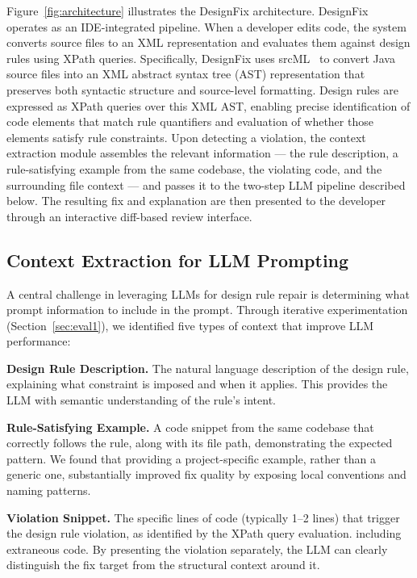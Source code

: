 \documentclass[conference]{IEEEtran}
\begin{document}
Figure~\ref{fig:architecture} illustrates the DesignFix architecture. DesignFix operates as an IDE-integrated pipeline. When a developer edits code, the system converts source files to an XML representation and evaluates them against design rules using XPath queries. Specifically, DesignFix uses srcML~\cite{collard2013srcml} to convert 
Java source files into an XML abstract syntax tree (AST) representation 
that preserves both syntactic structure and source-level formatting. 
Design rules are expressed as XPath queries over this XML AST, enabling 
precise identification of code elements that match rule quantifiers and 
evaluation of whether those elements satisfy rule constraints. Upon detecting a violation, the context extraction module assembles the relevant information — the rule description, a rule-satisfying example from the same codebase, the violating code, and the surrounding file context — and passes it to the two-step LLM pipeline described below. The resulting fix and explanation are then presented to the developer through an interactive diff-based review interface.

\subsection{Context Extraction for LLM Prompting}

A central challenge in leveraging LLMs for design rule repair is 
determining what prompt information to include in the prompt. Through iterative 
experimentation (Section~\ref{sec:eval1}), we identified 
five types of context that improve LLM performance:

\textbf{Design Rule Description.} The natural language description of 
the design rule, explaining what constraint is imposed and when it 
applies. This provides the LLM with semantic understanding of the 
rule's intent.

\textbf{Rule-Satisfying Example.} A code snippet from the same codebase 
that correctly follows the rule, along with its file path, demonstrating 
the expected pattern. We found that providing a project-specific example, 
rather than a generic one, substantially improved fix quality by exposing 
local conventions and naming patterns.

\textbf{Violation Snippet.} The specific lines of code (typically 1--2 
lines) that trigger the design rule violation, as identified by the 
XPath query evaluation. %
including extraneous code. 
By presenting the violation separately, the LLM can clearly distinguish the fix target from the structural context around it.
\end{document}
